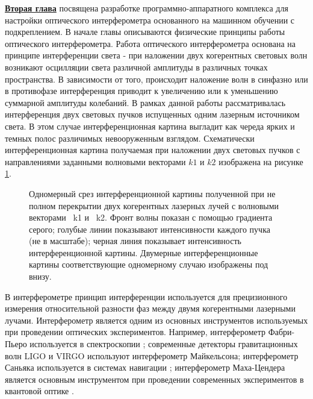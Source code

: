 \underline{\textbf{Вторая глава}} посвящена разработке программно-аппаратного комплекса для настройки оптического интерферометра основанного на машинном обучении с подкреплением.
В начале главы описываются физические принципы работы оптического интерферометра. Работа оптического интерферометра основана на принципе интерференции света - при наложении двух когерентных световых волн возникают осцилляции света различной амплитуды в различных точках пространства. В зависимости от того, происходит наложение волн в синфазно или в противофазе интерференция приводит к увеличению или к уменьшению суммарной амплитуды колебаний. В рамках данной работы рассматривалась интерференция двух световых пучков испущенных одним лазерным источником света. В этом случае интерференционная картина выгладит как череда ярких и темных полос различимых невооруженным взглядом. Схематически интерференционная картина получаемая при наложении двух световых пучков с направлениями заданными волновыми векторами $k1$ и $k2$ изображена на рисунке \ref{fig:two_beam_interf}.

\begin{figure}[ht]
    \caption{
     Одномерный срез интерференционной картины полученной при не полном перекрытии двух когерентных лазерных лучей с волновыми векторами ~k1 и ~k2. Фронт волны показан с помощью градиента серого; голубые линии показывают интенсивности каждого пучка (не в масштабе); черная линия показывает интенсивность интерференционной картины. Двумерные интерференционные картины соответствующие одномерному случаю изображены под внизу.}
\label{fig:two_beam_interf}
\end{figure}

В интерферометре принцип интерференции используется для прецизионного измерения относительной разности фаз между двумя когерентными лазерными лучами. Интерферометр является одним из основных инструментов используемых при проведении оптических экспериментов. Например, интерферометр Фабри-Пьеро используется в спектроскопии \cite{fabry-perot1899}; современные детекторы гравитационных волн LIGO и VIRGO \cite{LIGO, VIRGO} используют интерферометр Майкельсона; интерферометр Саньяка используется в системах навигации \cite{Kandpal2000}; интерферометр Маха-Цендера является основным инструментом при проведении современных экспериментов в квантовой оптике \cite{Ourjoumtsev2006, Sychev2017}.

